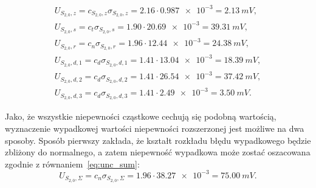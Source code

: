 \begin{gather}
U_{S_{2,0},z} = c_{S_{2,0},z} \sigma_{S_{2,0},z} = 2.16 \cdot \num{0.987e-3} = \qty{2.13}{mV} \label{eq:sym_partd_output_unc_roun_S_2_0},\\
U_{S_{2,0},s} = c_{t} \sigma_{S_{2,0},s} = 1.90 \cdot \num{20.69e-3} = \qty{39.31}{mV} \label{eq:sym_partd_output_unc_stat_S_2_0}, \\
U_{S_{2,0},r} = c_{n} \sigma_{S_{2,0},r} = 1.96 \cdot \num{12.44e-3} = \qty{24.38}{mV} \label{eq:sym_partd_output_unc_rand_S_2_0}, \\
U_{S_{2,0},d,1} = c_{d} \sigma_{S_{2,0},d,1} = 1.41 \cdot \num{13.04e-3} = \qty{18.39}{mV} \label{eq:sym_partd_output_unc_dyn_1_S_2_0}, \\
U_{S_{2,0},d,2} = c_{d} \sigma_{S_{2,0},d,2} = 1.41 \cdot \num{26.54e-3} = \qty{37.42}{mV} \label{eq:sym_partd_output_unc_dyn_2_S_2_0}, \\
U_{S_{2,0},d,3} = c_{d} \sigma_{S_{2,0},d,3} = 1.41 \cdot \num{2.49e-3} = \qty{3.50}{mV} \label{eq:sym_partd_output_unc_dyn_3_S_2_0}.
\end{gather}

Jako, że wszystkie niepewności cząstkowe cechują się podobną wartością, wyznaczenie wypadkowej wartości niepewności rozszerzonej jest możliwe na dwa sposoby. Sposób pierwszy zakłada, że kształt rozkładu błędu wypadkowego będzie zbliżony do normalnego, a zatem niepewność wypadkowa może zostać oszacowana zgodnie z równaniem~\eqref{eq:unc_sum}:
\begin{equation}
U_{S_{2,0},\Sigma} = c_{n} \sigma_{S_{2,0},\Sigma} = 1.96 \cdot \num{38.27e-3} = \qty{75.00}{mV} \label{eq:sym_partd_output_unc_total_a_S_2_0}.
\end{equation}

